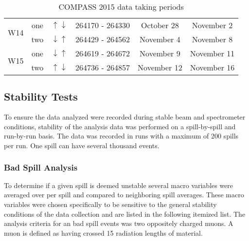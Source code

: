 \begin{table}[h!t]
\begin{tabular}{ |c|c|c|c|c|c| }
    \multirow{2}{2em}{W14}& one& $\uparrow \downarrow$& 264170 - 264330&
    October 28& November 2 \\ & two& $\downarrow \uparrow$& 264429 - 264562&
    November 4& November 8 \\ \hline

    \multirow{2}{2em}{W15}& one& $\downarrow \uparrow$& 264619 - 264672&
    November 9& November 11 \\ & two& $\uparrow \downarrow$& 264736 - 264857&
    November 12& November 16 \\ \hline
    
  \end{tabular}
  \caption{COMPASS 2015 data taking periods}
  \label{tab::datataking}
\end{table}

\subsection{Stability Tests} \label{sec::stability}
To ensure the data analyzed were recorded during stable beam and spectrometer
conditions, stability of the analysis data was performed on a spill-by-spill and
run-by-run basis.  The data was recorded in runs with a maximum of 200 spills
per run.  One spill can have several thousand events.

\subsubsection{Bad Spill Analysis} To determine if a given spill is deemed
unstable several macro variables were averaged over per spill and compared to
neighboring spill averages.  These macro variables were chosen specifically to
be sensitive to the general stability conditions of the data collection and are
listed in the following itemized list.  The analysis criteria for an bad
spill events was two oppositely charged muons.  A muon is defined as having
crossed 15 radiation lengths of material.

